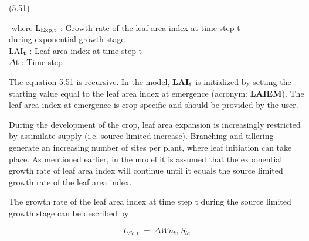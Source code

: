 \documentclass[11pt]{article}
\begin{document}
 \bigskip
\strut\hfill (5.51)
\nwln
\begin{tabbing}
\hspace{1.27cm}\=\hspace{1.27cm}\=\hspace{1.27cm}\=\hspace{1.27cm}\=%
\hspace{1.27cm}\=\hspace{1.27cm}\=\hspace{1.27cm}\=\hspace{1.27cm}\=%
\hspace{1.27cm}\=\hspace{1.27cm}\=\kill
where\> L$_{{\rm Exp,t}}$\> : Growth rate of the leaf area index at time step t\\
\>\>   during exponential growth stage\> \> \> \> \> \> \> \> [ha ha$^{{\rm -1}}$ d$^{{\rm -1}}$]\\
\>LAI$_{{\rm t}}$\> : Leaf area index at time step t \> \> \> \> \> \> \> \> [ha ha$^{{\rm -1}}$]\\
\>$\Delta$t\> : Time step\> \> \> \> \> \> \> \> [d]
\end{tabbing}

\bigskip
The equation 5.51 is recursive. In the model, {\bf LAI$_{{\rm t}}$} is initialized by setting the starting
value equal to the leaf area index at emergence (acronym: {\bf LAIEM}). The leaf area index
at emergence is crop specific and should be provided by the user.

\bigskip
\bigskip
During the development of the crop, leaf area expansion is increasingly restricted by
assimilate supply (i.e. source limited increase). Branching and tillering generate an
increasing number of sites per plant, where leaf initiation can take place. As mentioned
earlier, in the model it is assumed that the exponential growth rate of leaf area index will
continue until it equals the source limited growth rate of the leaf area index.

\bigskip
\bigskip
The growth rate of the leaf area index at time step t during the source limited growth 
stage can be described by:

\begin{displaymath}
L _{Sc,t} ~=~\Delta Wn _{lv} ~S _{la} 
\end{displaymath}
\end{document}
